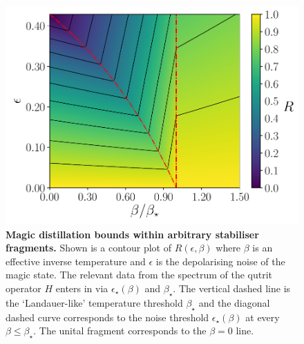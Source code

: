\documentclass[pra,
aps,
twocolumn,
superscriptaddress,
groupedaddress,
nofootinbib,
reprint
]{revtex4-1}
\begin{document}
\begin{figure}[t!]
    \centering
    \includegraphics[scale=0.4]{figs/rate_scatter.pdf}
    \caption{\textbf{Magic distillation bounds within arbitrary stabiliser fragments.}
  Shown is a contour plot of  $R(\epsilon, \beta)$ where $\beta$ is an effective inverse temperature and $\epsilon$ is the depolarising noise of the magic state. The relevant data from the spectrum of the qutrit operator $H$ enters in via $\epsilon_\star(\beta)$ and $\beta_\star$.  The vertical dashed line is the `Landauer-like' temperature threshold $\beta_\star$ and the diagonal dashed curve corresponds to the noise threshold $\epsilon_\star (\beta)$ at every $\beta \leq \beta_\star$. The unital fragment corresponds to the $\beta =0 $ line.
    }
    \label{fig:rate_contour}
\end{figure}
\end{document}
